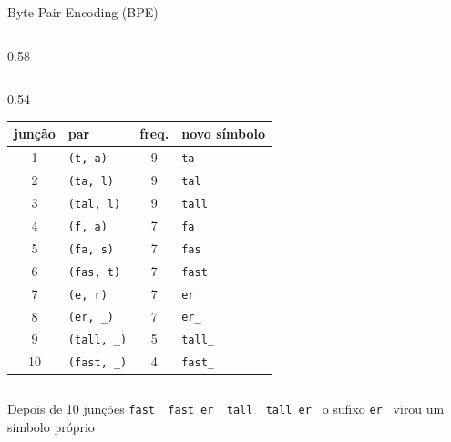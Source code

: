 \begin{frame}{Byte Pair Encoding (BPE)}
\begin{columns}[T, onlytextwidth]
\begin{column}{0.58\textwidth}
\begin{columns}[T, onlytextwidth]
                \begin{column}{0.54\textwidth}
                    \scriptsize
                    \setlength{\tabcolsep}{3pt}
                    \begin{tabular}{clcl}
                        \toprule
                        junção & par & freq. & novo símbolo \\
                        \midrule
                        1 & \texttt{(t, a)} & 9 & \textcolor{blue!70!black}{\texttt{ta}} \\
                        2 & \texttt{(ta, l)} & 9 & \textcolor{blue!70!black}{\texttt{tal}} \\
                        3 & \texttt{(tal, l)} & 9 & \textcolor{blue!70!black}{\texttt{tall}} \\
                        4 & \texttt{(f, a)} & 7 & \textcolor{blue!70!black}{\texttt{fa}} \\
                        5 & \texttt{(fa, s)} & 7 & \textcolor{blue!70!black}{\texttt{fas}} \\
                        6 & \texttt{(fas, t)} & 7 & \textcolor{blue!70!black}{\texttt{fast}} \\
                        7 & \texttt{(e, r)} & 7 & \textcolor{blue!70!black}{\texttt{er}} \\
                        8 & \texttt{(er, \_)} & 7 & \textcolor{blue!70!black}{\texttt{er\_}} \\
                        9 & \texttt{(tall, \_)} & 5 & \textcolor{blue!70!black}{\texttt{tall\_}} \\
                        10 & \texttt{(fast, \_)} & 4 & \textcolor{blue!70!black}{\texttt{fast\_}} \\
                        \bottomrule
                    \end{tabular}
                \end{column}
            \end{columns}
        \end{column}
    \end{columns}
    
    \vspace{0.4em}
    
    \begin{exampleblock}{Depois de 10 junções}
        \small
        \textcolor{teal!80!black}{\texttt{fast\_ \quad fast er\_ \quad tall\_ \quad tall er\_}} \hfill \textcolor{teal!80!black}{o sufixo \texttt{er\_} virou um símbolo próprio}
    \end{exampleblock}
\end{frame}

